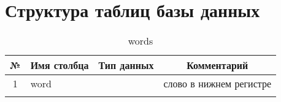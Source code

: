 \documentclass[main]{subfiles}
\begin{document}
\section{Структура таблиц базы данных}\label{app:A}

\begin{table}[!h]
	\begin{center}
		\captionsetup{format=hang,labelsep = endash, singlelinecheck=false}
		\caption{words}
		\begin{tabular}{|c|l|l|l|}
			\hline
			\textbf{№} & \multicolumn{1}{c|}{\textbf{Имя столбца}} & \multicolumn{1}{c|}{\textbf{Тип данных}} & \multicolumn{1}{c|}{\textbf{Комментарий}} \\ \hline
			1& word &                                 & слово в нижнем регистре\\ \hline
			&                                  &                                 &                                  \\ \hline
		\end{tabular}
	\end{center}
\end{table}
\end{document}
